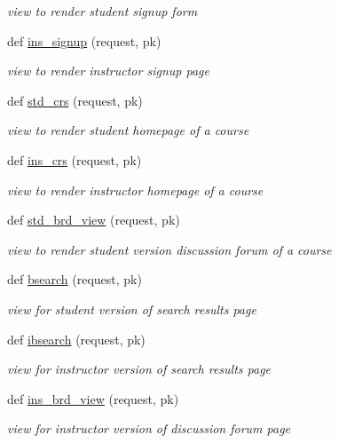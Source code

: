 \begin{DoxyCompactItemize}
\begin{DoxyCompactList}\small\item\em view to render student signup form \end{DoxyCompactList}\item 
def \hyperlink{namespaceviews_a0ed125b20e6a581a4422ebbd790aed41}{ins\+\_\+signup} (request, pk)
\begin{DoxyCompactList}\small\item\em view to render instructor signup page \end{DoxyCompactList}\item 
def \hyperlink{namespaceviews_a8486f9dfd40c5b1cce7bd6862605d3a7}{std\+\_\+crs} (request, pk)
\begin{DoxyCompactList}\small\item\em view to render student homepage of a course \end{DoxyCompactList}\item 
def \hyperlink{namespaceviews_ad3cfae172effde7b8fbbc62dd48d4991}{ins\+\_\+crs} (request, pk)
\begin{DoxyCompactList}\small\item\em view to render instructor homepage of a course \end{DoxyCompactList}\item 
def \hyperlink{namespaceviews_a0b09d75c284ee0e91ed8559abf29ee8e}{std\+\_\+brd\+\_\+view} (request, pk)
\begin{DoxyCompactList}\small\item\em view to render student version discussion forum of a course \end{DoxyCompactList}\item 
def \hyperlink{namespaceviews_a2737dd5931e62c3e58b0abc4689b3447}{bsearch} (request, pk)
\begin{DoxyCompactList}\small\item\em view for student version of search results page \end{DoxyCompactList}\item 
def \hyperlink{namespaceviews_a1d353b91771edc183ea0941a27cd0596}{ibsearch} (request, pk)
\begin{DoxyCompactList}\small\item\em view for instructor version of search results page \end{DoxyCompactList}\item 
def \hyperlink{namespaceviews_ab0a436af6f7268b5ce966fcce64b024d}{ins\+\_\+brd\+\_\+view} (request, pk)
\begin{DoxyCompactList}\small\item\em view for instructor version of discussion forum page \end{DoxyCompactList}\item 

\end{DoxyCompactItemize}
